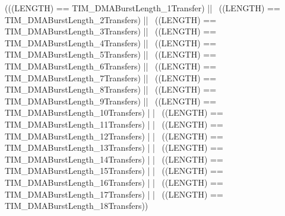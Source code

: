 \begin{DoxyCode}
(((LENGTH) == TIM_DMABurstLength_1Transfer) || \
                                   ((LENGTH) == TIM_DMABurstLength_2Transfers) ||
       \
                                   ((LENGTH) == TIM_DMABurstLength_3Transfers) ||
       \
                                   ((LENGTH) == TIM_DMABurstLength_4Transfers) ||
       \
                                   ((LENGTH) == TIM_DMABurstLength_5Transfers) ||
       \
                                   ((LENGTH) == TIM_DMABurstLength_6Transfers) ||
       \
                                   ((LENGTH) == TIM_DMABurstLength_7Transfers) ||
       \
                                   ((LENGTH) == TIM_DMABurstLength_8Transfers) ||
       \
                                   ((LENGTH) == TIM_DMABurstLength_9Transfers) ||
       \
                                   ((LENGTH) == TIM_DMABurstLength_10Transfers) |
      | \
                                   ((LENGTH) == TIM_DMABurstLength_11Transfers) |
      | \
                                   ((LENGTH) == TIM_DMABurstLength_12Transfers) |
      | \
                                   ((LENGTH) == TIM_DMABurstLength_13Transfers) |
      | \
                                   ((LENGTH) == TIM_DMABurstLength_14Transfers) |
      | \
                                   ((LENGTH) == TIM_DMABurstLength_15Transfers) |
      | \
                                   ((LENGTH) == TIM_DMABurstLength_16Transfers) |
      | \
                                   ((LENGTH) == TIM_DMABurstLength_17Transfers) |
      | \
                                   ((LENGTH) == TIM_DMABurstLength_18Transfers))
\end{DoxyCode}

